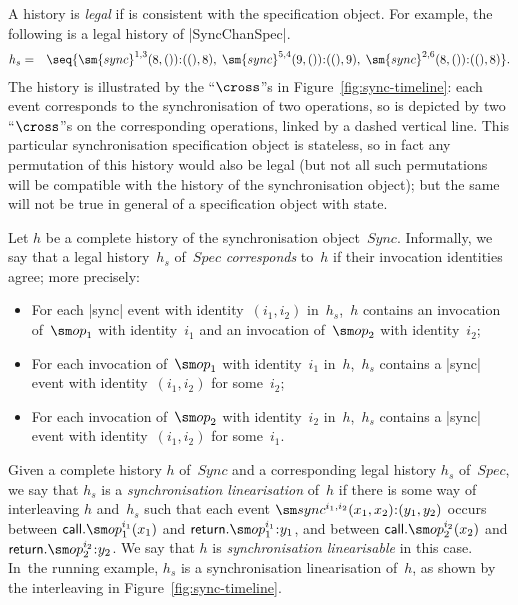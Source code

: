 A history is \emph{legal} if is consistent with the specification object.  
%
For example, the following is a legal history of |SyncChanSpec|.
\begin{eqnarray*}
h_s & = & 
\seq{
 \sm{sync}^{1,3}(8,()) \:: ((), 8), \;
 \sm{sync}^{5,4}(9,()) \:: ((), 9), \;
 \sm{sync}^{2,6}(8,()) \:: ((), 8) } .
\end{eqnarray*}
The history is illustrated by the ``$\cross$''s in
Figure~\ref{fig:sync-timeline}: each event corresponds to the synchronisation
of two operations, so is depicted by two ``$\cross$''s on the corresponding
operations, linked by a dashed vertical line.  This particular synchronisation
specification object is stateless, so in fact any permutation of this history
would also be legal (but not all such permutations will be compatible with the
history of the synchronisation object); but the same will not be true in
general of a specification object with state.

Let $h$ be a complete history of the synchronisation object~$Sync$.
Informally, we say that a legal history~$h_s$ of~$Spec$ \emph{corresponds}
to~$h$ if their invocation identities agree; more precisely:
%
\begin{itemize}
\item For each |sync| event with identity~$(i_1,i_2)$ in~$h_s$,\, $h$ contains
  an invocation of~$\op_1$ with identity~$i_1$ and an invocation of~$\op_2$ with
  identity~$i_2$;

\item For each invocation of~$\op_1$ with identity~$i_1$ in~$h$,\, $h_s$
  contains a |sync| event with identity~$(i_1,i_2)$ for some~$i_2$;

\item For each invocation of~$\op_2$ with identity~$i_2$ in~$h$,\, $h_s$
  contains a |sync| event with identity~$(i_1,i_2)$ for some~$i_1$.
\end{itemize}
%

Given a complete history $h$ of~$Sync$ and a corresponding legal history $h_s$
of~$Spec$, we say that $h_s$ is a \emph{synchronisation linearisation} of~$h$
if there is some way of interleaving $h$ and~$h_s$ such that each event
$\sync^{i_1, i_2}(x_1, x_2)\:: (y_1, y_2)$ occurs between
$\call.\op_1^{i_1}(x_1)$ and $\return.\op_1^{i_1}\::y_1$, and between
$\call.\op_2^{i_2}(x_2)$ and $\return.\op_2^{i_2}\::y_2$.
%
We say that $h$ is \emph{synchronisation linearisable} in this case.
In~the running example, $h_s$ is a synchronisation linearisation of~$h$,
as shown by the interleaving in Figure~\ref{fig:sync-timeline}.

